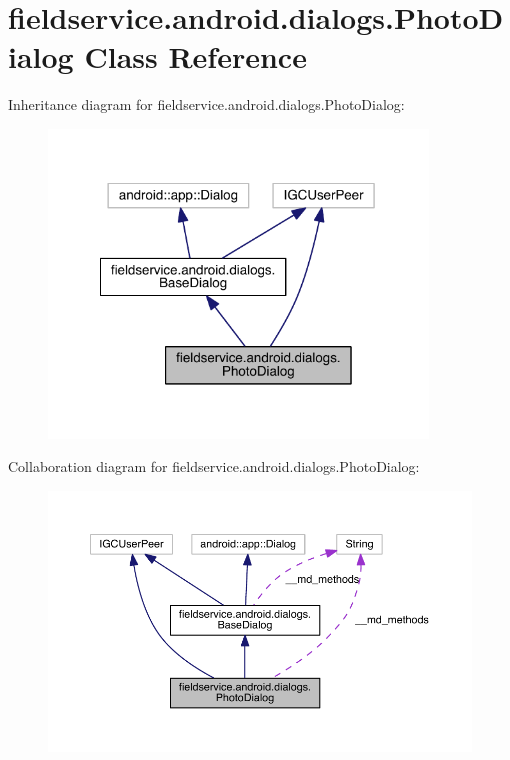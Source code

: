 \hypertarget{classfieldservice_1_1android_1_1dialogs_1_1_photo_dialog}{\section{fieldservice.\+android.\+dialogs.\+Photo\+Dialog Class Reference}
\label{classfieldservice_1_1android_1_1dialogs_1_1_photo_dialog}
}


Inheritance diagram for fieldservice.\+android.\+dialogs.\+Photo\+Dialog\+:
\nopagebreak
\begin{figure}[H]
\begin{center}
\leavevmode
\includegraphics[width=286pt]{classfieldservice_1_1android_1_1dialogs_1_1_photo_dialog__inherit__graph}
\end{center}
\end{figure}


Collaboration diagram for fieldservice.\+android.\+dialogs.\+Photo\+Dialog\+:
\nopagebreak
\begin{figure}[H]
\begin{center}
\leavevmode
\includegraphics[width=350pt]{classfieldservice_1_1android_1_1dialogs_1_1_photo_dialog__coll__graph}
\end{center}
\end{figure}
